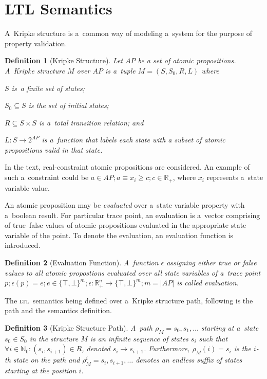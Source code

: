 \documentclass[12pt,twoside,draft]{fithesis}
\newcommand{\ltl}{\textsc{ltl}~}
\newcommand{\mReal}{\mathbb{R}}
\newcommand{\mNatural}{\mathbb{N}}
\newtheorem{mydef}{Definition}
\begin{document}
\section{LTL Semantics}
A~Kripke structure is a~common way of modeling a~system for the purpose
of property validation\cite{clarke}.
\begin{mydef}[Kripke Structure]
Let ${AP}$ be a set of atomic propositions.
A~Kripke structure\cite{clarke} $M$ over $AP$ is a~tuple
$M=(S, S_0, R, L)$ where
\begin{inparaenum}
	\item{}$S$ is~a finite set of states;
	\item{}$S_0\subseteq{}S$ is the set of initial states;
	\item{}$R\subseteq{}S\times{}S$ is a~total transition relation; and
	\item{}$L:S\rightarrow{}2^{AP}$ is a~function that labels each state
		with a subset of atomic propositions valid in that state.
\end{inparaenum}
\end{mydef}
In the text, real-constraint atomic propositions are considered.
An example of such a~constraint could be
$a\in AP;a\equiv x_i \geq c;c\in\mReal_{+}$, where $x_i$ represents
a~state variable value.

An atomic proposition may be \emph{evaluated}
over a~state variable property with a~boolean result. For particular
trace point, an evaluation is a~vector comprising of true--false values
of atomic propositions evaluated in the appropriate state variable of
the point. To denote the evaluation, an evaluation function is
introduced.
\begin{mydef}[Evaluation Function]
A~function $\epsilon$ assigning either true or false values to
all atomic propostions evaluated over all state variables of a~trace
point $p;\epsilon(p)=e;e\in\{\top,\bot\}^m; \epsilon:\mReal_{+}^n
\rightarrow\{\top,\bot\}^m;m=|AP|$ is called evaluation.
\end{mydef}

The \ltl semantics being defined over a~Kripke structure
path\cite{clarke}, following is the path and the semantics definition.
\begin{mydef}[Kripke Structure Path]
A~path $\rho_M=s_0,s_1,\dotsc$ starting at a~state
$s_0\in S_0$ in the structure $M$ is an infinite sequence of states
$s_i$ such that $\forall i \in \mNatural_0: (s_i, s_{i+1}) \in R$,
denoted $s_i\rightarrow s_{i+1}$. 
Furthermore, $\rho_M(i)=s_i$ is the $i$-th state on the path and
$\rho_M^i=s_i,s_{i+1},\dotsc$ denotes an endless suffix of states
starting at the position $i$.
\end{mydef}
\end{document}
